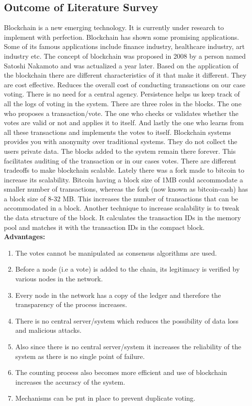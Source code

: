\documentclass[oneside, 12pt]{book}
\begin{document}
		\subsection{Outcome of Literature Survey}
			Blockchain is a new emerging technology. It is currently under research to implement with perfection. Blockchain has shown some promising applications. Some of its famous applications include finance industry, healthcare industry, art industry etc. The concept of blockchain was proposed in 2008 by a person named Satoshi Nakamoto and was actualized a year later. Based on the application of the blockchain there are different characteristics of it that make it different. They are cost effective. Reduces the overall cost of conducting transactions on our case voting. There is no need for a central agency. Persistence helps us keep track of all the logs of voting in the system. There are three roles in the blocks. The one who proposes a transaction/vote. The one who checks or validates whether the votes are valid or not and applies it to itself. And lastly the one who learns from all these transactions and implements the votes to itself. Blockchain systems provides you with anonymity over traditional systems. They do not collect the users private data. The blocks added to the system remain there forever. This facilitates auditing of the transaction or in our cases votes. There are different tradeoffs to make blockchain scalable. Lately there was a fork made to bitcoin to increase its scalability. Bitcoin having a block size of 1MB could accommodate a smaller number of transactions, whereas the fork (now known as bitcoin-cash) has a block size of 8-32 MB. This increases the number of transactions that can be accommodated in a block. Another technique to increase scalability is to tweak the data structure of the block. It calculates the transaction IDs in the memory pool and matches it with the transaction IDs in the compact block.
			\\\textbf{Advantages:}
			\begin{enumerate}
				\item The votes cannot be manipulated as consensus algorithms are used.
				\item Before a node (i.e a vote) is added to the chain, its legitimacy is verified by various nodes in the network.
				\item Every node in the network has a copy of the ledger and therefore the transparency of the process increases.
				\item There is no central server/system which reduces the possibility of data loss and malicious attacks.
				\item Also since there is no central server/system it increases the reliability of the system as there is no single point of failure.
				\item The counting process also becomes more efficient and use of blockchain increases the accuracy of the system.
				\item Mechanisms can be put in place to prevent duplicate voting.
			\end{enumerate}
\end{document}
